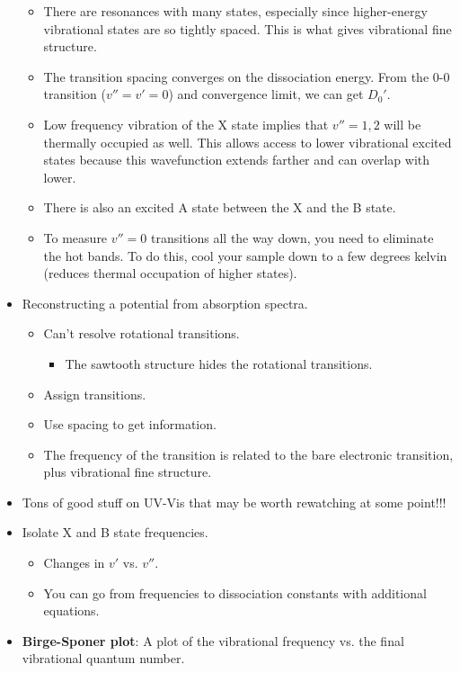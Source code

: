 \documentclass[../notes.tex]{subfiles}
\begin{document}
\begin{itemize}
\begin{itemize}
        \item There are resonances with many states, especially since higher-energy vibrational states are so tightly spaced. This is what gives vibrational fine structure.
        \item The transition spacing converges on the dissociation energy. From the 0-0 transition ($v''=v'=0$) and convergence limit, we can get $D_0'$.
        \item Low frequency vibration of the X state implies that $v''=1,2$ will be thermally occupied as well. This allows access to lower vibrational excited states because this wavefunction extends farther and can overlap with lower.
        \item There is also an excited A state between the X and the B state.
        \item To measure $v''=0$ transitions all the way down, you need to eliminate the hot bands. To do this, cool your sample down to a few degrees kelvin (reduces thermal occupation of higher states).
    \end{itemize}
    \item Reconstructing a potential from absorption spectra.
    \begin{itemize}
        \item Can't resolve rotational transitions.
        \begin{itemize}
            \item The sawtooth structure hides the rotational transitions.
        \end{itemize}
        \item Assign transitions.
        \item Use spacing to get information.
        \item The frequency of the transition is related to the bare electronic transition, plus vibrational fine structure.
    \end{itemize}
    \item Tons of good stuff on UV-Vis that may be worth rewatching at some point!!!
    \item Isolate X and B state frequencies.
    \begin{itemize}
        \item Changes in $v'$ vs. $v''$.
        \item You can go from frequencies to dissociation constants with additional equations.
    \end{itemize}
    \item \textbf{Birge-Sponer plot}: A plot of the vibrational frequency vs. the final vibrational quantum number.

\end{itemize}
\end{document}
